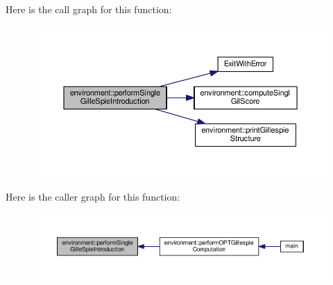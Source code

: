 Here is the call graph for this function\-:\nopagebreak
\begin{figure}[H]
\begin{center}
\leavevmode
\includegraphics[width=350pt]{a00011_a30a0827eed2860d03d5fa5318fcf86b0_cgraph}
\end{center}
\end{figure}




Here is the caller graph for this function\-:\nopagebreak
\begin{figure}[H]
\begin{center}
\leavevmode
\includegraphics[width=350pt]{a00011_a30a0827eed2860d03d5fa5318fcf86b0_icgraph}
\end{center}
\end{figure}


